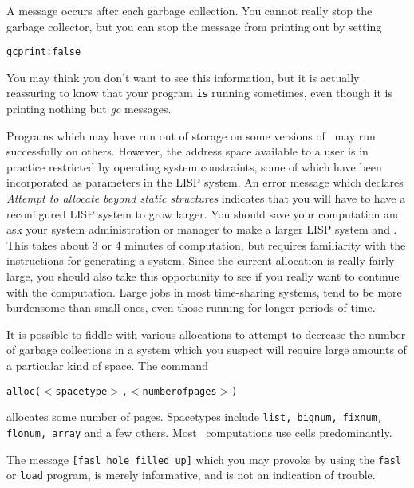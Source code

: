 A message occurs after each garbage collection. You cannot really stop
the garbage collector, but you can stop
the message from printing out by setting 
\begin{center} {\tt gcprint:false} \end{center}
You may think you don't want to see this information, but it is actually
reassuring to know that your program {\tt is} running sometimes, even
though it is printing nothing but {\it gc} messages.

Programs which may have run out of storage on some versions of \Max\
may run successfully on others. However, the address space
available to a user is in practice restricted by operating
system constraints, some of which have been incorporated as
parameters in the LISP system.  An error message which declares
{\it Attempt to allocate beyond static structures} indicates that
you will have to have a reconfigured LISP system to grow larger.
You should save your computation and ask your system administration or
manager to make a larger LISP system and \Max.  This
takes about 3 or 4 minutes of computation, but requires
familiarity with the instructions for generating a system.
Since the current allocation is
really fairly large, you should also take this opportunity
to see if you really want to continue with the computation.  Large
jobs in most time-sharing systems,
tend to be more burdensome than small ones, even those running for longer
periods of time.

It is possible to fiddle with various allocations to attempt to
decrease the number of garbage collections in a system which you
suspect will require large amounts of a particular kind of
space.  The command
\begin{center}
{\tt alloc($<$spacetype$>$,$<$numberofpages$>$)}
\end{center}
allocates some number of 
pages.  Spacetypes include  {\tt list, bignum, fixnum, flonum, array} and
a few others. Most \Max\ computations use cells predominantly.

The message {\tt [fasl hole filled up]}  which you may provoke by using
the {\tt fasl} or {\tt load} program, is merely informative, and is not 
an indication of trouble.


